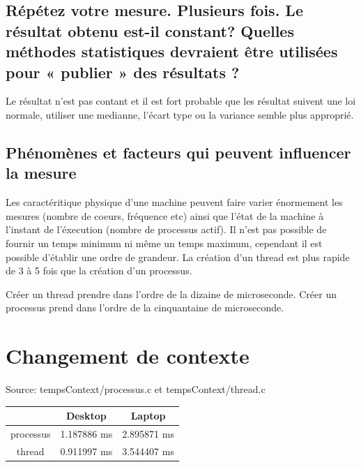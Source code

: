 \documentclass[12pt]{article}
\begin{document}
	\subsection{Répétez votre mesure. Plusieurs fois. Le résultat obtenu est-il constant? Quelles méthodes statistiques devraient être utilisées pour « publier » des résultats ?}

		Le résultat n'est pas contant et il est fort probable que les résultat suivent
		une loi normale, utiliser une medianne, l'écart type ou la variance semble plus approprié.
		\newline

	\subsection{Phénomènes et facteurs qui peuvent influencer la mesure}

		Les caractéritique physique d'une machine peuvent faire varier énormement les
		mesures (nombre de coeurs, fréquence etc) ainsi que l'état de la machine à
		l'instant de l'éxecution (nombre de processus actif).
		Il n'est pas possible de fournir un temps minimum ni même un temps maximum,
		cependant il est possible d'établir une ordre de grandeur.
		La création d'un thread est plus rapide de 3 à 5 fois que la création d'un
		processus.\newline

		Créer un thread prendre dans l'ordre de la dizaine de microseconde. \newline
		Créer un processus prend dans l'ordre de la cinquantaine de microseconde.\newline

\section{Changement de contexte}

Source: tempsContext/processus.c et tempsContext/thread.c

\begin{center}
	\begin{tabular}{ | c | c | c | }
		\hline
			&	Desktop      &    Laptop \\
		\hline
			processus & 1.187886 ms &  2.895871 ms \\
		\hline
			thread    & 0.911997 ms &  3.544407 ms \\
		\hline
	\end{tabular}
\end{center}
\end{document}
